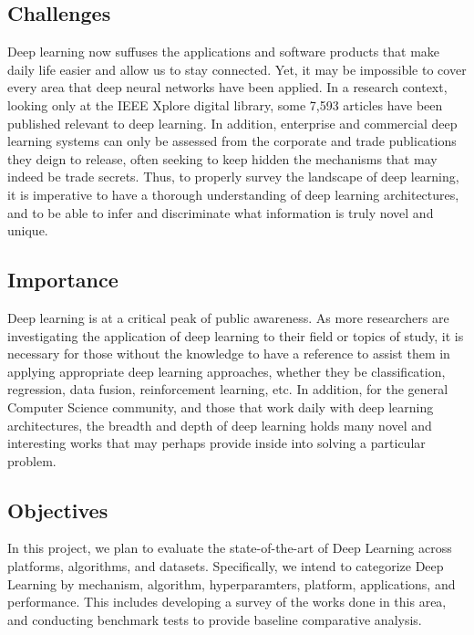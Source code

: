 \documentclass[12pt]{article}
\begin{document}
	\subsection{Challenges}\hspace{4ex} Deep learning now suffuses the applications and software products that make daily life easier and allow us to stay connected. Yet, it may be impossible to cover every area that deep neural networks have been applied. In a research context, looking only at the IEEE Xplore digital library, some 7,593 articles have been published relevant to deep learning. In addition, enterprise and commercial deep learning systems can only be assessed from the corporate and trade publications they deign to release, often seeking to keep hidden the mechanisms that may indeed be trade secrets. Thus, to properly survey the landscape of deep learning, it is imperative to have a thorough understanding of deep learning architectures, and to be able to infer and discriminate what information is truly novel and unique. \\
		
	\subsection{Importance}\hspace{4ex} Deep learning is at a critical peak of public awareness. As more researchers are investigating the application of deep learning to their field or topics of study, it is necessary for those without the knowledge to have a reference to assist them in applying appropriate deep learning approaches, whether they be classification, regression, data fusion, reinforcement learning, etc. In addition, for the general Computer Science community, and those that work daily with deep learning architectures, the breadth and depth of deep learning holds many novel and interesting works that may perhaps provide inside into solving a particular problem. 
	
	\subsection{Objectives}\hspace{4ex}In this project, we plan to evaluate the state-of-the-art of Deep Learning across platforms, algorithms, and datasets. Specifically, we intend to categorize Deep Learning by mechanism, algorithm, hyperparamters, platform, applications, and performance. This includes developing a survey of the works done in this area, and conducting benchmark tests to provide baseline comparative analysis. 
\end{document}
